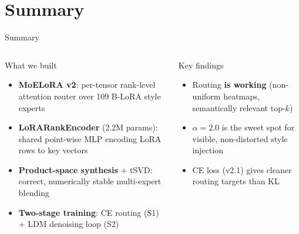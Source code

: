 \documentclass[aspectratio=169,10pt]{beamer}
\begin{document}
\section{Summary}

\begin{frame}[shrink=10]{Summary}
  \begin{columns}[T]
      \begin{exampleblock}{What we built}
        \begin{itemize}
          \item \textbf{MoELoRA v2}: per-tensor rank-level attention router over 109 B-LoRA style experts
          \item \textbf{LoRARankEncoder} (2.2M params): shared point-wise MLP encoding LoRA rows to key vectors
          \item \textbf{Product-space synthesis} + tSVD: correct, numerically stable multi-expert blending
          \item \textbf{Two-stage training}: CE routing (S1) + LDM denoising loop (S2)
        \end{itemize}
      \end{exampleblock}
      \begin{block}{Key findings}
        \begin{itemize}
          \item Routing \textbf{is working} (non-uniform heatmaps, semantically relevant top-$k$)
          \item $\alpha=2.0$ is the sweet spot for visible, non-distorted style injection
          \item CE loss (v2.1) gives cleaner routing targets than KL
        \end{itemize}
      \end{block}


\end{columns}
\end{frame}
\end{document}
